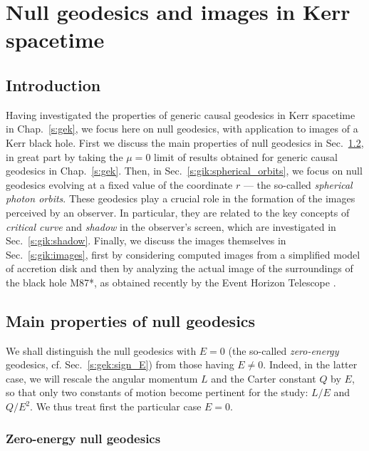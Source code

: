 \chapter{Null geodesics and images in Kerr spacetime}
\label{s:gik}

\minitoc

\section{Introduction}

Having investigated the properties of generic causal geodesics
in Kerr spacetime in Chap.~\ref{s:gek}, we focus here on null
geodesics, with application to images of a Kerr black hole.
First we discuss the main properties of null geodesics in Sec.~\ref{s:gik:properties},
in great part by taking the $\mu=0$ limit of results obtained for generic causal
geodesics in Chap.~\ref{s:gek}. Then, in Sec.~\ref{s:gik:spherical_orbits}, we
focus on null geodesics evolving at a fixed value of the coordinate $r$ --- the so-called
\emph{spherical photon orbits}. These geodesics play a crucial role in the
formation of the images perceived by an observer.
In particular, they are related to the key concepts of \emph{critical curve} and \emph{shadow}
in the observer's screen, which are investigated in Sec.~\ref{s:gik:shadow}.
Finally, we discuss the images themselves in Sec.~\ref{s:gik:images}, first by
considering computed images from a simplified model of accretion disk
and then by analyzing the actual image of the surroundings of the black
hole M87*, as obtained recently by the Event Horizon Telescope \cite{EHT19a}.


\section{Main properties of null geodesics} \label{s:gik:properties}

We shall distinguish the null geodesics with $E=0$ (the so-called \emph{zero-energy} geodesics,
cf. Sec.~\ref{s:gek:sign_E})
 from those having
$E \neq 0$. Indeed, in the latter case, we will rescale the angular momentum
$L$ and the Carter constant $Q$ by $E$, so that only two constants of motion become
pertinent for the study: $L/E$ and $Q/E^2$.
We thus treat first the particular case $E=0$.

\subsection{Zero-energy null geodesics} \label{s:gik:zero_energy}

